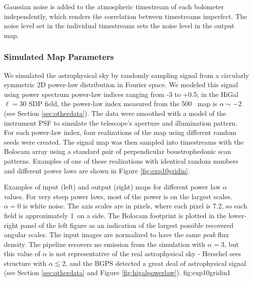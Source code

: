 
Gaussian noise is added to the atmospheric timestream of each bolometer
independently, which renders the correlation between timestreams imperfect.
The noise level set in the individual timestreams sets the noise level in the
output map.


\subsubsection{Simulated Map Parameters}
We simulated the astrophysical sky by
randomly sampling signal from a circularly symmetric 2D power-law distribution in Fourier space.  We
modeled this signal using power spectrum power-law indices ranging from -3 to
+0.5; in the HiGal $\ell=30$ SDP field, the power-law index measured from the
500 \um\ map is $\alpha\sim-2$ (see Section \ref{sec:otherdata}).
The data were smoothed with a model of the instrument PSF to simulate the
telescope's aperture and illumination pattern.  
For each power-law index, four realizations of the map using different random seeds
were created.  
The signal map was then sampled into timestreams with the Bolocam array using
a standard pair of perpendicular boustrophedonic scan patterns.  
Examples of one of these realizations with identical random numbers and
different power laws are shown in Figure \ref{fig:exp10gridin}.

{Examples of input (left) and output (right) maps for different power law $\alpha$ values.
For very steep power laws, most of the power is on the largest scales.  
$\alpha=0$ is white noise.  The axis scales are in pixels, where each pixel
is 7.2\arcsec, so each field is approximately 1\arcdeg\ on a side.  The Bolocam
footprint is plotted in the lower-right panel of the left figure as an
indication of the largest possible recovered angular scales.  The input images are
normalized to have the same \emph{peak} flux density.
The pipeline recovers no emission from the simulation with $\alpha=3$, but this
value of $\alpha$ is not representative of the real astrophysical sky -
Herschel sees structure with $\alpha\lesssim2$, and the BGPS detected a great
deal of astrophysical signal (see Section \ref{sec:otherdata} and Figure
\ref{fig:higalpowerlaw}).
}
{fig:exp10gridin}{1}


